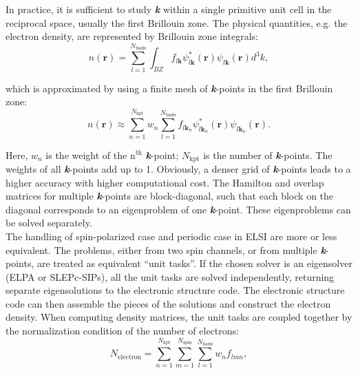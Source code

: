 \documentclass{report}
\begin{document}
\noindent In practice, it is sufficient to study \textbf{\textit{k}} within a single primitive unit cell in the reciprocal space, usually the first Brillouin zone.  The physical quantities, e.g. the electron density, are represented by Brillouin zone integrals:\\
\begin{equation}
\label{eq:bz}
n (\boldsymbol{r}) = \sum_{l=1}^{N_\text{basis}} \int_{BZ} f_{l \boldsymbol{k}} \psi_{l \boldsymbol{k}}^* (\boldsymbol{r}) \psi_{l \boldsymbol{k}} (\boldsymbol{r}) d^3 k ,
\end{equation}

\noindent which is approximated by using a finite mesh of \textbf{\textit{k}}-points in the first Brillouin zone:\\
\begin{equation}
\label{eq:k_grid}
n (\boldsymbol{r}) \approx \sum_{n=1}^{N_\text{kpt}} w_n
\sum_{l=1}^{N_\text{basis}} f_{l \boldsymbol{k}_n} \psi_{l \boldsymbol{k}_n}^* (\boldsymbol{r}) \psi_{l \boldsymbol{k}_n} (\boldsymbol{r}) .
\end{equation}

\noindent Here, $w_n$ is the weight of the n$^\text{th}$ \textbf{\textit{k}}-point; $N_\text{kpt}$ is the number of \textbf{\textit{k}}-points.  The weights of all \textbf{\textit{k}}-points add up to 1.  Obviously, a denser grid of \textbf{\textit{k}}-points leads to a higher accuracy with higher computational cost.  The Hamilton and overlap matrices for multiple \textbf{\textit{k}}-points are block-diagonal, such that each block on the diagonal corresponds to an eigenproblem of one \textbf{\textit{k}}-point.  These eigenproblems can be solved separately.\\

The handling of spin-polarized case and periodic case in ELSI are more or less equivalent.  The problems, either from two spin channels, or from multiple \textbf{\textit{k}}-points, are treated as equivalent ``unit tasks''.  If the chosen solver is an eigensolver (ELPA or SLEPc-SIPs), all the unit tasks are solved independently, returning separate eigensolutions to the electronic structure code.  The electronic structure code can then assemble the pieces of the solutions and construct the electron density.  When computing density matrices, the unit tasks are coupled together by the normalization condition of the number of electrons:\\
\begin{equation}
\label{eq:normalization}
N_\text{electron} = \sum_{n=1}^{N_\text{kpt}} \sum_{m=1}^{N_\text{spin}} \sum_{l=1}^{N_\text{basis}} w_n f_{lmn} ,
\end{equation}
\end{document}
